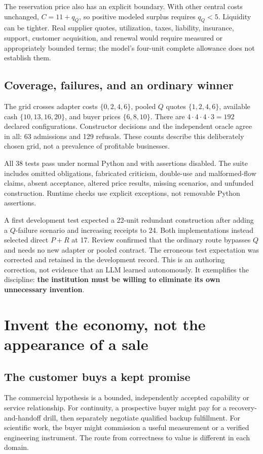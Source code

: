 \documentclass[11pt,a4paper]{article}
\newcommand{\term}[1]{\textbf{#1}}
\begin{document}
The reservation price also has an explicit boundary. With other central costs unchanged, $C=11+q_Q$, so positive modeled surplus requires $q_Q<5$. Liquidity can be tighter. Real supplier quotes, utilization, taxes, liability, insurance, support, customer acquisition, and renewal would require measured or appropriately bounded terms; the model's four-unit complete allowance does not establish them.

\subsection{Coverage, failures, and an ordinary winner}
The grid crosses adapter costs $\{0,2,4,6\}$, pooled $Q$ quotes $\{1,2,4,6\}$, available cash $\{10,13,16,20\}$, and buyer prices $\{6,8,10\}$. There are $4\cdot4\cdot4\cdot3=192$ declared configurations. Constructor decisions and the independent oracle agree in all: 63 admissions and 129 refusals. These counts describe this deliberately chosen grid, not a prevalence of profitable businesses.

All 38 tests pass under normal Python and with assertions disabled. The suite includes omitted obligations, fabricated criticism, double-use and malformed-flow claims, absent acceptance, altered price results, missing scenarios, and unfunded construction. Runtime checks use explicit exceptions, not removable Python assertions.

A first development test expected a 22-unit redundant construction after adding a $Q$-failure scenario and increasing receipts to 24. Both implementations instead selected direct $P+R$ at 17. Review confirmed that the ordinary route bypasses $Q$ and needs no new adapter or pooled contract. The erroneous test expectation was corrected and retained in the development record. This is an authoring correction, not evidence that an LLM learned autonomously. It exemplifies the discipline: \term{the institution must be willing to eliminate its own unnecessary invention}.

\section{Invent the economy, not the appearance of a sale}
\subsection{The customer buys a kept promise}
The commercial hypothesis is a bounded, independently accepted capability or service relationship. For continuity, a prospective buyer might pay for a recovery-and-handoff drill, then separately negotiate qualified backup fulfillment. For scientific work, the buyer might commission a useful measurement or a verified engineering instrument. The route from correctness to value is different in each domain.
\end{document}
